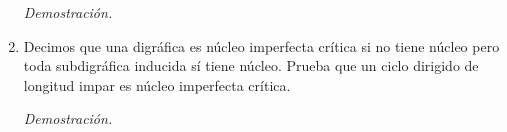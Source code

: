 \documentclass[12pt, fleqn]{article}
\begin{document}
\begin{enumerate}
		\emph{Demostración.}

		
		
		\item Decimos que una digráfica es núcleo imperfecta crítica si no tiene núcleo pero toda subdigráfica inducida sí tiene núcleo. Prueba que un ciclo dirigido de longitud impar es núcleo imperfecta crítica.
		
		\emph{Demostración.}

		
		
	\end{enumerate}
\end{document}
